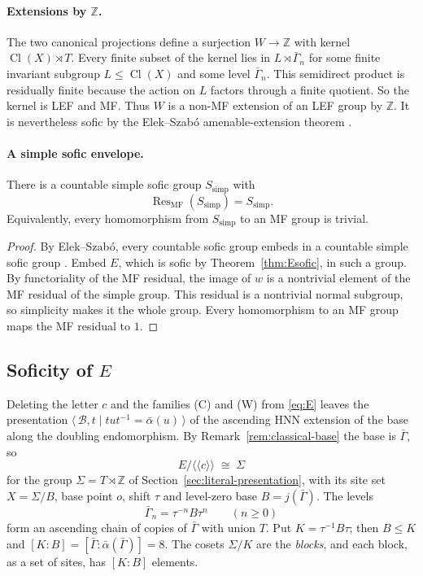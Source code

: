 \documentclass[11pt]{amsart}
\newcommand{\leanverified}[2]{\ignorespaces}
\theoremstyle{definition}
\theoremstyle{remark}
\theoremstyle{plain}
\newcommand{\Z}{\mathbb Z}
\newcommand{\Cl}{\operatorname{Cl}}
\begin{document}
\paragraph{Extensions by $\Z$.}
The two canonical projections define a surjection $W\to\Z$ with kernel
$\Cl(X)\rtimes T$.  Every finite subset of the kernel lies in
$L\rtimes\bar\Gamma_n$ for some finite invariant subgroup
$L\le\Cl(X)$ and some level $\bar\Gamma_n$.  This semidirect product is
residually finite because the action on $L$ factors through a finite
quotient.  So the kernel is LEF and MF\@.  Thus $W$ is a non-MF
extension of an LEF group by $\Z$.  It is nevertheless sofic by the
Elek--Szab\'o amenable-extension theorem \cite{ElekSzabo}.
\leanverified{Sofic/LEFMarkedCompression}{GroupApproximation.LiteralLEFExtension.literalWitness_LEFKernel_integerExtension_nonMF}
\leanverified{Sofic/SoficByAmenablePermanence}{GroupApproximation.SoficByAmenablePermanence.manuscriptSoficOfSoficKerOfAmenableQuotient}

\paragraph{A simple sofic envelope.}
There is a countable simple sofic group $S_{\mathrm{simp}}$ with
\[
 \operatorname{Res}_{\mathrm{MF}}(S_{\mathrm{simp}})=S_{\mathrm{simp}}.
\]
Equivalently, every homomorphism from $S_{\mathrm{simp}}$ to an MF group is
trivial.

\begin{proof}
By Elek--Szab\'o, every countable sofic group embeds in a countable simple
sofic group \cite[Theorem~1]{ElekSzaboHyper}.  Embed $E$, which is sofic
by Theorem~\ref{thm:Esofic}, in such a group.  By functoriality of
the MF residual, the image of $w$ is a nontrivial element of the MF
residual of the simple group.  This residual is a nontrivial normal
subgroup, so simplicity makes it the whole group.  Every homomorphism to an MF group maps the MF residual to $1$.
\end{proof}
\leanverified{Sofic/SimpleSoficEnvelopeUnconditional}{GroupApproximation.SimpleSoficEnvelopeUnconditional.manuscript_simpleSoficEnvelope}

\subsection{Soficity of $E$}\label{sec:Esofic}

Deleting the letter $c$ and the families \textup{(C)} and \textup{(W)}
from \eqref{eq:E} leaves the presentation
$\langle\,\mathcal B,t\mid tut^{-1}=\bar\alpha(u)\,\rangle$ of the
ascending HNN extension of the base along the doubling endomorphism.
By Remark~\ref{rem:classical-base} the base is $\bar\Gamma$, so
\[
 E/\langle\!\langle c\rangle\!\rangle\;\cong\;\Sigma
\]
for the group $\Sigma=T\rtimes\Z$ of Section~\ref{sec:literal-presentation}, with
its site set $X=\Sigma/B$, base point $o$, shift $\tau$ and level-zero
base $B=j(\bar\Gamma)$.  The levels
\[
 \bar\Gamma_n=\tau^{-n}B\tau^{n}\qquad(n\ge0)
\]
form an ascending chain of copies of $\bar\Gamma$ with union
$T$.  Put $K=\tau^{-1}B\tau$; then $B\le K$ and
$[K:B]=[\bar\Gamma:\bar\alpha(\bar\Gamma)]=8$.  The cosets
$\Sigma/K$ are the \emph{blocks}, and each block, as a set of sites, has
$[K:B]$ elements.
\end{document}
